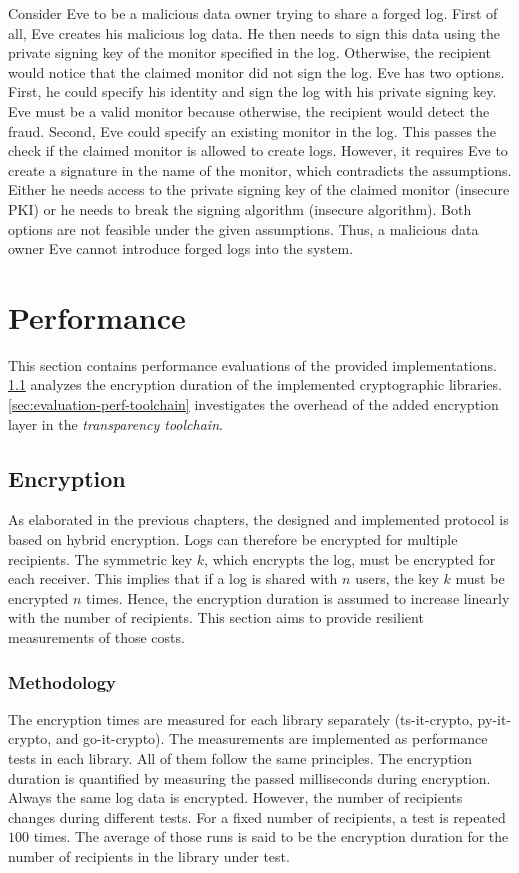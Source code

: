 \documentclass[../main.tex]{subfiles}
\begin{document}
Consider Eve to be a malicious data owner trying to share a forged log.
First of all, Eve creates his malicious log data.
He then needs to sign this data using the private signing key of the monitor specified in the log.
Otherwise, the recipient would notice that the claimed monitor did not sign the log.
Eve has two options.
First, he could specify his identity and sign the log with his private signing key.
Eve must be a valid monitor because otherwise, the recipient would detect the fraud.
Second, Eve could specify an existing monitor in the log.
This passes the check if the claimed monitor is allowed to create logs.
However, it requires Eve to create a signature in the name of the monitor, which contradicts the assumptions.
Either he needs access to the private signing key of the claimed monitor (insecure PKI) or he needs to break the signing algorithm (insecure algorithm).
Both options are not feasible under the given assumptions.
Thus, a malicious data owner Eve cannot introduce forged logs into the system.

\section{Performance}
\label{sec:evaluation-perf}
This section contains performance evaluations of the provided implementations.
\cref{sec:evaluation-perf-enc} analyzes the encryption duration of the implemented cryptographic libraries.
\cref{sec:evaluation-perf-toolchain} investigates the overhead of the added encryption layer in the \emph{transparency toolchain}.

\subsection{Encryption}
\label{sec:evaluation-perf-enc}
As elaborated in the previous chapters, the designed and implemented protocol is based on hybrid encryption.
Logs can therefore  be encrypted for multiple recipients.
The symmetric key $k$, which encrypts the log, must be encrypted for each receiver.
This implies that if a log is shared with $n$ users, the key $k$ must be encrypted $n$ times.
Hence, the encryption duration is assumed to increase linearly with the number of recipients.
This section aims to provide resilient measurements of those costs.

\subsubsection{Methodology}
The encryption times are measured for each library separately (ts-it-crypto, py-it-crypto, and go-it-crypto).
The measurements are implemented as performance tests in each library.
All of them follow the same principles.
The encryption duration is quantified by measuring the passed milliseconds during encryption.
Always the same log data is encrypted.
However, the number of recipients changes during different tests.
For a fixed number of recipients, a test is repeated $100$ times.
The average of those runs is said to be the encryption duration for the number of recipients in the library under test.
\end{document}
